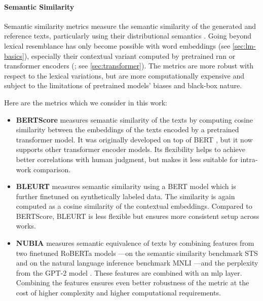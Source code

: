 \paragraph{Semantic Similarity} Semantic similarity metrics measure the semantic similarity of the generated and reference texts, particularly using their distributional semantics . Going beyond lexical resemblance has only become possible with word embeddings (see \autoref{sec:lm-basics}), especially their contextual variant computed by pretrained \ac{rnn} or transformer encoders (\citealp{peters2018deep,devlinBERTPretrainingDeep2019}; see \autoref{sec:transformer}). The metrics are more robust with respect to the lexical variations, but are more computationally expensive and subject to the limitations of pretrained models' biases and black-box nature.

Here are the metrics which we consider in this work:

\begin{itemize}
    \item \textbf{BERTScore} \cite{zhang2019bertscore} measures semantic similarity of the texts by computing cosine similarity between the embeddings of the texts encoded by a pretrained transformer model. It was originally developed on top of BERT \cite{devlinBERTPretrainingDeep2019}, but it now supports other transformer encoder models. Its flexibility helps to achieve better correlations with human judgment, but makes it less suitable for intra-work comparison.
    \item \textbf{BLEURT} \cite{sellam2020bleurt} measures semantic similarity using a BERT model \cite{devlinBERTPretrainingDeep2019} which is further finetuned on synthetically labeled data. The similarity is again computed as a cosine similarity of the contextual embeddings. Compared to BERTScore, BLEURT is less flexible but ensures more consistent setup across works.
    \item \textbf{NUBIA} \cite{kaneNUBIANeUralBased2020} measures semantic equivalence of texts by combining features from two finetuned RoBERTa models \cite{liuRoBERTaRobustlyOptimized2019}---on the semantic similarity benchmark STS \cite{cer-etal-2017-semeval} and on the natural language inference benchmark MNLI \cite{williams2018mnli}---and the perplexity from the GPT-2 model \cite{radford2019language}. These features are combined with an \ac{mlp} layer. Combining the features ensures even better robustness of the metric at the cost of higher complexity and higher computational requirements.
\end{itemize}

